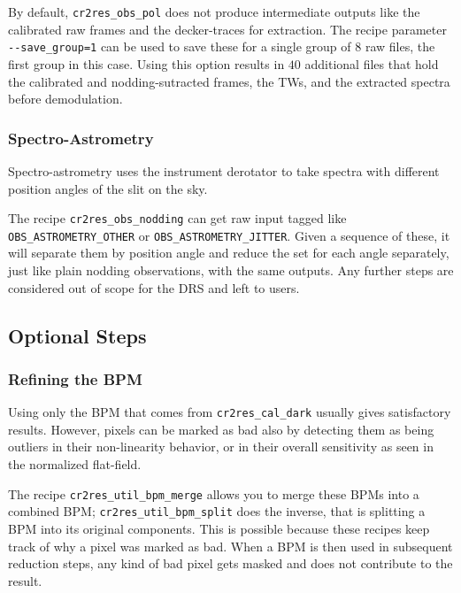 By default, \verb!cr2res_obs_pol! does not produce intermediate outputs like the
calibrated raw frames and the decker-traces for extraction. The recipe parameter
\verb!--save_group=1! can be used to save these for a single group of $8$ raw
files, the first group in this case. Using this option results in $40$
additional files that hold the calibrated and nodding-sutracted frames, the TWs,
and the extracted spectra before demodulation.

\subsubsection{Spectro-Astrometry}

Spectro-astrometry uses the instrument derotator to take spectra with different
position angles of the slit on the sky.

The recipe \verb!cr2res_obs_nodding! can get raw input tagged like
\verb!OBS_ASTROMETRY_OTHER! or \linebreak\verb!OBS_ASTROMETRY_JITTER!. Given a sequence of
these, it will separate them by position angle and reduce the set for each angle
separately, just like plain nodding observations, with the same outputs. Any
further steps are considered out of scope for the DRS and left to users.

\subsection{Optional Steps}

\subsubsection{Refining the BPM}

Using only the BPM that comes from \texttt{cr2res\_cal\_dark} usually gives
satisfactory results. However, pixels can be marked as bad also by detecting
them as being outliers in their non-linearity behavior, or in their overall
sensitivity as seen in the normalized flat-field.

The recipe \texttt{cr2res\_util\_bpm\_merge} allows you to merge these BPMs into
a combined BPM; \linebreak\texttt{cr2res\_util\_bpm\_split} does the inverse, that is
splitting a BPM into its original components. This is possible because these
recipes keep track of why a pixel was marked as bad. When a BPM is then used in
subsequent reduction steps, any kind of bad pixel gets masked and does not
contribute to the result.


